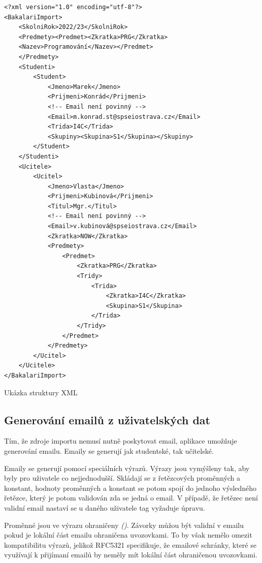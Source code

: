 \begin{code}[H]
  \begin{verbatim}
<?xml version="1.0" encoding="utf-8"?>
<BakalariImport>
    <SkolniRok>2022/23</SkolniRok>
    <Predmety><Predmet><Zkratka>PRG</Zkratka>
    <Nazev>Programování</Nazev></Predmet>
    </Predmety>
    <Studenti>
        <Student>
            <Jmeno>Marek</Jmeno>
            <Prijmeni>Konrád</Prijmeni>
            <!-- Email není povinný -->
            <Email>m.konrad.st@spseiostrava.cz</Email>
            <Trida>I4C</Trida>
            <Skupiny><Skupina>S1</Skupina></Skupiny>
        </Student>
    </Studenti>
    <Ucitele>
        <Ucitel>
            <Jmeno>Vlasta</Jmeno>
            <Prijmeni>Kubinová</Prijmeni>
            <Titul>Mgr.</Titul>
            <!-- Email není povinný -->
            <Email>v.kubinová@spseiostrava.cz</Email>
            <Zkratka>NOW</Zkratka>
            <Predmety>
                <Predmet>
                    <Zkratka>PRG</Zkratka>
                    <Tridy>
                        <Trida>
                            <Zkratka>I4C</Zkratka>
                            <Skupina>S1</Skupina>
                        </Trida>
                    </Tridy>
                </Predmet>
            </Predmety>
        </Ucitel>       
    </Ucitele>
</BakalariImport>
\end{verbatim}
\caption{Ukázka struktury XML}
\end{code}




\subsection{Generování emailů z uživatelských dat}

Tím, že zdroje importu nemusí nutně poskytovat email, aplikace umožňuje generování emailu.
Emaily se generují jak studentské, tak učitelské.

Emaily se generují pomocí speciálních výrazů.
Výrazy jsou vymýšleny tak, aby byly pro uživatele co nejjednodušší.
Skládají se z řetězcových proměnných a konstant, hodnoty proměnných a konstant se potom spojí do jednoho výsledného řetězce, který je potom validován zda se jedná o email.
V případě, že řetězec není validní email nastaví se u daného uživatele tag vyžaduje úpravu. 

Proměnné jsou ve výrazu ohraničeny \textit{()}.
Závorky můžou být validní v emailu pokud je lokální část emailu ohraničena uvozovkami\cite{wiki-email-address}.
To by však nemělo omezit kompatibilitu výrazů, jelikož RFC5321 specifikuje, že emailové schránky, které se využívají k přijímaní emailů by neměly mít lokální část ohraničenou uvozovkami\cite{rfc5321}.

